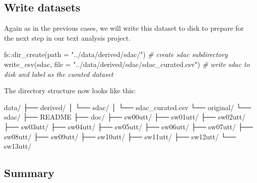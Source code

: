 \documentclass[
  letterpaper,
]{scrbook}
\newenvironment{Shaded}{\begin{snugshade}}{\end{snugshade}}
\newcommand{\AttributeTok}[1]{\textcolor[rgb]{0.00,0.00,0.00}{#1}}
\newcommand{\CommentTok}[1]{\textcolor[rgb]{0.00,0.00,0.00}{\textit{#1}}}
\newcommand{\ExtensionTok}[1]{\textcolor[rgb]{0.00,0.00,0.00}{#1}}
\newcommand{\FunctionTok}[1]{\textcolor[rgb]{0.00,0.00,0.00}{#1}}
\newcommand{\NormalTok}[1]{\textcolor[rgb]{0.00,0.00,0.00}{#1}}
\newcommand{\SpecialCharTok}[1]{\textcolor[rgb]{0.00,0.00,0.00}{#1}}
\newcommand{\StringTok}[1]{\textcolor[rgb]{0.00,0.00,0.00}{#1}}
\begin{document}
\hypertarget{write-datasets}{%
\subsection{Write datasets}\label{write-datasets}}

Again as in the previous cases, we will write this dataset to disk to
prepare for the next step in our text analysis project.

\begin{Shaded}
\begin{Highlighting}[]
\NormalTok{fs}\SpecialCharTok{::}\FunctionTok{dir\_create}\NormalTok{(}\AttributeTok{path =} \StringTok{"../data/derived/sdac/"}\NormalTok{) }\CommentTok{\# create sdac subdirectory}
\FunctionTok{write\_csv}\NormalTok{(sdac, }
          \AttributeTok{file =} \StringTok{"../data/derived/sdac/sdac\_curated.csv"}\NormalTok{) }\CommentTok{\# write sdac to disk and label as the curated dataset}
\end{Highlighting}
\end{Shaded}

The directory structure now looks like this:

\begin{Shaded}
\begin{Highlighting}[]
\ExtensionTok{data/}
\ExtensionTok{├──}\NormalTok{ derived/}
\ExtensionTok{│}\NormalTok{   └── sdac/}
\ExtensionTok{│}\NormalTok{       └── sdac\_curated.csv}
\ExtensionTok{└──}\NormalTok{ original/}
    \ExtensionTok{└──}\NormalTok{ sdac/}
        \ExtensionTok{├──}\NormalTok{ README}
        \ExtensionTok{├──}\NormalTok{ doc/}
        \ExtensionTok{├──}\NormalTok{ sw00utt/}
        \ExtensionTok{├──}\NormalTok{ sw01utt/}
        \ExtensionTok{├──}\NormalTok{ sw02utt/}
        \ExtensionTok{├──}\NormalTok{ sw03utt/}
        \ExtensionTok{├──}\NormalTok{ sw04utt/}
        \ExtensionTok{├──}\NormalTok{ sw05utt/}
        \ExtensionTok{├──}\NormalTok{ sw06utt/}
        \ExtensionTok{├──}\NormalTok{ sw07utt/}
        \ExtensionTok{├──}\NormalTok{ sw08utt/}
        \ExtensionTok{├──}\NormalTok{ sw09utt/}
        \ExtensionTok{├──}\NormalTok{ sw10utt/}
        \ExtensionTok{├──}\NormalTok{ sw11utt/}
        \ExtensionTok{├──}\NormalTok{ sw12utt/}
        \ExtensionTok{└──}\NormalTok{ sw13utt/}
\end{Highlighting}
\end{Shaded}

\hypertarget{summary-8}{%
\subsection{Summary}\label{summary-8}}
\end{document}
